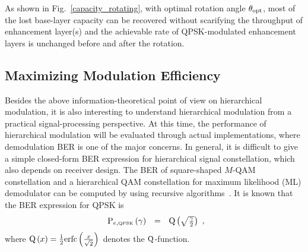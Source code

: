 \documentclass[conference]{IEEEtran}
\begin{document}
  As shown in
Fig.~\ref{capacity_rotating}, with optimal rotation angle
$\theta_{\rm opt}$, most of the lost base-layer capacity can be
recovered without scarifying the throughput of enhancement
layer(s) and the achievable rate of QPSK-modulated enhancement
layers is unchanged before and after the rotation.
\subsection{Maximizing Modulation Efficiency}

Besides the above information-theoretical point of view on
hierarchical modulation, it is also interesting to understand
hierarchical modulation from a practical signal-processing
perspective. At this time, the performance of hierarchical
modulation will be evaluated through actual implementations, where
demodulation BER is one of the major concerns. In general, it is
difficult to give a simple closed-form BER expression for
hierarchical signal constellation, which also depends on receiver
design. The BER of square-shaped $M$-QAM constellation and a
hierarchical QAM constellation for maximum likelihood (ML)
demodulator can be computed by using recursive
algorithms~\cite{Vitt03}. It is known that the BER expression for
QPSK is
\begin{equation}
\begin{array}{rcl}
{\rm P}_{e,\mbox{\tiny QPSK}}\left(\gamma\right)&=&{\rm
Q}\left(\sqrt{\frac{\gamma}{2}}\right)
\end{array},\label{BER_QPSK}
\end{equation}
\noindent where ${\rm Q}\left(x\right)=\frac{1}{2}{\rm
erfc}\left(\frac{x}{\sqrt{2}}\right)$ denotes the $\rm
Q$-function.
\begin{figure} 
\end{figure}
\end{document}
